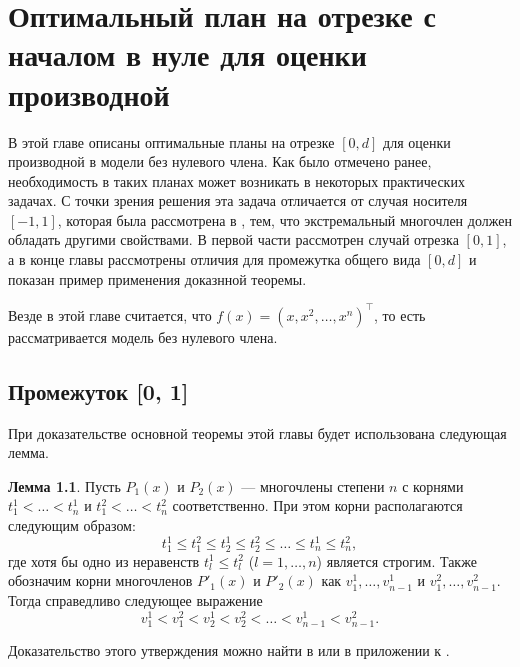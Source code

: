 \documentclass[specialist,
               substylefile = spbu.rtx,
               subf,href,colorlinks=true, 12pt]{disser}
\theoremstyle{definition}
\newtheorem{lemma}{Лемма}
\begin{document}
	
	
  
	\chapter{Оптимальный план на отрезке с началом в нуле для оценки производной}
  
  В этой главе описаны оптимальные планы на отрезке $[0, d]$ для оценки производной в модели без нулевого члена. Как было отмечено ранее, необходимость в таких планах может возникать в некоторых практических задачах. С точки зрения решения эта задача отличается от случая носителя $[-1, 1]$, которая была рассмотрена в \cite{melasmain}, тем, что экстремальный многочлен должен обладать другими свойствами. В первой части рассмотрен случай отрезка $[0,1]$, а в конце главы рассмотрены отличия для промежутка общего вида $[0, d]$ и показан пример применения доказнной теоремы.
  
  Везде в этой главе считается, что $f(x) = (x, x^2, \ldots, x^n)^\top$, то есть рассматривается модель без нулевого члена.
  
  \section{Промежуток [0, 1]}
  
  При доказательстве основной теоремы этой главы будет использована следующая лемма.
  
  \begin{lemma}
  \label{lemma:droots}
  	Пусть $P_1(x)$ и $P_2(x)$ --- многочлены степени $n$ с корнями $t^1_1 < \ldots < t^1_n$ и $t^2_1 < \ldots < t^2_n$ соответственно. При этом корни располагаются следующим образом:
  	\begin{equation*}
  		t^1_1 \leqslant t^2_1 \leqslant t^1_2 \leqslant t^2_2 \leqslant \ldots \leqslant t^1_n \leqslant t^2_n,
  	\end{equation*}
  	где хотя бы одно из неравенств $t_l^1 \leqslant t_l^2$ ($l = 1, \ldots, n$) является строгим. Также обозначим корни многочленов $P'_1(x)$ и $P'_2(x)$ как $v_1^1, \ldots, v_{n-1}^1$ и $v_1^2, \ldots, v_{n-1}^2$. Тогда справедливо следующее выражение
  	\begin{equation*}
  		v^1_1 < v^2_1 < v^1_2 < v^2_2 < \ldots < v^1_{n-1} < v^2_{n-1}.
  	\end{equation*}
  \end{lemma}
  Доказательство этого утверждения можно найти в \cite{sahmphd} или в приложении к \cite{melasmain}.
  
\end{document}
